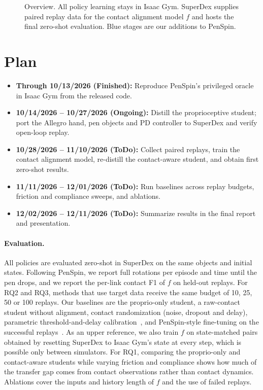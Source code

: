 \documentclass{article}
\begin{document}
\begin{figure}[t]
\centering

\caption{Overview. All policy learning stays in Isaac Gym. SuperDex supplies paired replay data for the contact alignment model $f$ and hosts the final zero-shot evaluation. Blue stages are our additions to PenSpin.}
\label{fig:pipeline}
\end{figure}

\section{Plan}

\begin{itemize}[leftmargin=*]
  \item \textbf{Through 10/13/2026 (Finished):} Reproduce PenSpin's privileged oracle in Isaac Gym from the released code.
  \item \textbf{10/14/2026 -- 10/27/2026 (Ongoing):} Distill the proprioceptive student; port the Allegro hand, pen objects and PD controller to SuperDex and verify open-loop replay.
  \item \textbf{10/28/2026 -- 11/10/2026 (ToDo):} Collect paired replays, train the contact alignment model, re-distill the contact-aware student, and obtain first zero-shot results.
  \item \textbf{11/11/2026 -- 12/01/2026 (ToDo):} Run baselines across replay budgets, friction and compliance sweeps, and ablations.
  \item \textbf{12/02/2026 -- 12/11/2026 (ToDo):} Summarize results in the final report and presentation.
\end{itemize}

\paragraph{Evaluation.} All policies are evaluated zero-shot in SuperDex on the same objects and initial states. Following PenSpin, we report full rotations per episode and time until the pen drops, and we report the per-link contact F1 of $f$ on held-out replays. For RQ2 and RQ3, methods that use target data receive the same budget of 10, 25, 50 or 100 replays. Our baselines are the proprio-only student, a raw-contact student without alignment, contact randomization (noise, dropout and delay), parametric threshold-and-delay calibration~\citep{real2sim2real2026}, and PenSpin-style fine-tuning on the successful replays~\citep{wang2024penspin}. As an upper reference, we also train $f$ on state-matched pairs obtained by resetting SuperDex to Isaac Gym's state at every step, which is possible only between simulators. For RQ1, comparing the proprio-only and contact-aware students while varying friction and compliance shows how much of the transfer gap comes from contact observations rather than contact dynamics. Ablations cover the inputs and history length of $f$ and the use of failed replays.


\end{document}
